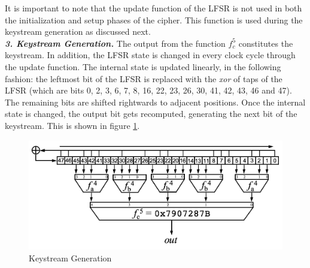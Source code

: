 It is important to note that the update function of the LFSR is not used in both the initialization and setup phases of the cipher. This function is used during the keystream generation as discussed next.\\



%

\noindent \textit{\textbf{3. Keystream Generation.}} The output from the function $f_c^5$ constitutes the keystream. In addition, the LFSR state is changed in every clock cycle through the update function. The internal state is updated linearly, in the following fashion: the leftmost bit of the LFSR is replaced with the \textit{xor} of taps of the LFSR (which are bits 0, 2, 3, 6, 7, 8, 16, 22, 23, 26, 30, 41, 42, 43, 46 and 47). The remaining bits are shifted rightwards to adjacent positions. Once the internal state is changed, the output bit gets recomputed, generating the next bit of the keystream. This is shown in figure \ref{fig:hitag2-3}. 

%

\begin{figure}[ht!]
	\centering
		\includegraphics[width=5in]{./figures/hitag2-3.PNG}
	\caption{Keystream Generation}	
	\label{fig:hitag2-3}
\end{figure}

